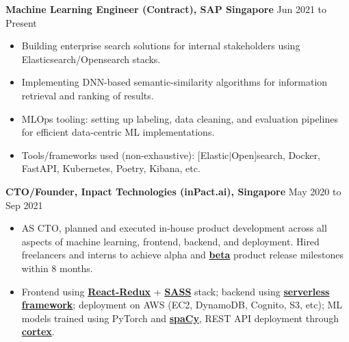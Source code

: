 \documentclass[10pt]{article}
\newenvironment{myinnerlist}[1][\enskip\textbullet]%
        {\begin{itemize}[#1,leftmargin=*,parsep=0pt,itemsep=3pt,topsep=0pt,partopsep=0pt]}
        {\end{itemize}\vspace{.6\baselineskip}}
\newcommand{\localtextbulletone}{\textcolor{gray}{\raisebox{.45ex}{\rule{.8ex}{.8ex}}}}
\begin{document}
{
    \hspace*{-\marginparsep minus \marginparwidth}%
    \begin{minipage}[t]{\textwidth+\marginparwidth+\marginparsep}%

        \textbf{Machine Learning Engineer (Contract), SAP Singapore} \hfill {Jun 2021 to Present}

        \vspace{0.1in}
        \begin{myinnerlist}
            \renewcommand{\labelitemi}{\localtextbulletone}

            \item Building enterprise search solutions for internal stakeholders using Elasticsearch/Opensearch stacks.
            \item Implementing DNN-based semantic-similarity algorithms for information retrieval and ranking of results.
            \item MLOps tooling: setting up labeling, data cleaning, and evaluation pipelines for efficient data-centric ML implementations.
            \item Tools/frameworks used (non-exhaustive): [Elastic$\vert$Open]search, Docker, FastAPI, Kubernetes, Poetry, Kibana, etc.

        \end{myinnerlist}

        \textbf{CTO/Founder, Inpact Technologies (inPact.ai), Singapore} \hfill {May 2020 to Sep 2021}

        \vspace{0.1in}
        \begin{myinnerlist}
            \renewcommand{\labelitemi}{\localtextbulletone}

            \item AS CTO, planned and executed in-house product development
                across all aspects of machine learning, frontend, backend, and
                deployment. Hired freelancers and interns to achieve alpha and
                \href{https://raw.githubusercontent.com/sidmontu/sidmontu.github.io/master/misc/beta_screen.png}{\bf
                beta} product release milestones within 8 months.

            \item Frontend using \href{https://react-redux.js.org/}{\bf
                React-Redux} + \href{https://sass-lang.com/}{\bf SASS} stack;
                backend using \href{https://aws.amazon.com/serverless/}{\bf
                serverless framework}; deployment on AWS (EC2, DynamoDB,
                Cognito, S3, etc); ML models trained using PyTorch and
                \href{https://spacy.io/}{\bf spaCy}, REST API deployment through
                \href{https://www.cortex.dev/}{\bf cortex}.


\end{myinnerlist}
\end{minipage}}
\end{document}
